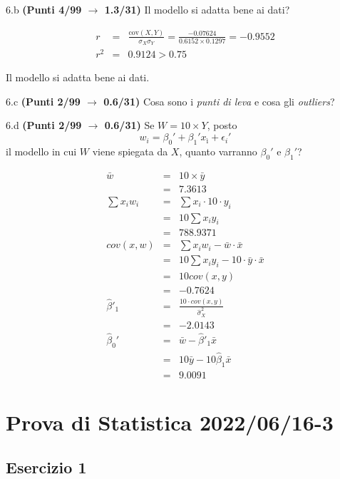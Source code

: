 \documentclass[
  11pt,
]{book}
\theoremstyle{mytheoremstyle}
\theoremstyle{mydefstyle}
\newenvironment{sol}
  {
  \begin{tcolorbox}[enhanced,breakable,arc=0.1mm,boxrule=1pt,colback=white,colframe=iblue,
  title=\bf \fontfamily{lmss}\selectfont \hspace{.5 cm} Soluzione,drop fuzzy shadow]

}{
\end{tcolorbox}
  }
\begin{document}
6.b \textbf{(Punti 4/99 \(\rightarrow\) 1.3/31)} Il modello si adatta bene ai dati?

\begin{sol}
\begin{eqnarray*}
r&=&\frac{\text{cov}(X,Y)}{\sigma_X\sigma_Y}=\frac{ -0.07624 }{ 0.6152 \times 0.1297 }= -0.9552 \\ 
r^2&=& 0.9124 > 0.75
\end{eqnarray*}

Il modello si adatta bene ai dati.

\end{sol}

6.c \textbf{(Punti 2/99 \(\rightarrow\) 0.6/31)} Cosa sono i \emph{punti di leva} e cosa gli \emph{outliers}?

6.d \textbf{(Punti 2/99 \(\rightarrow\) 0.6/31)} Se \(W=10\times Y\), posto
\[w_i=\beta_0'+\beta_1'x_ì +\epsilon_i'\]
il modello in cui \(W\) viene spiegata da \(X\), quanto varranno \(\beta_0'\) e \(\beta_1'\)?

\begin{sol}
\begin{eqnarray*}
  \bar w &=& 10\times \bar y\\
  &=& 7.3613\\
  \sum x_iw_i&=&\sum x_i\cdot 10\cdot y_i\\
  &=& 10\sum x_i y_i\\
  &=& 788.9371\\
  cov(x,w)&=&\sum x_iw_i-\bar w\cdot\bar x\\
  &=&10\sum x_i y_i - 10 \cdot\bar y\cdot\bar x\\
  &=&10 cov(x,y)\\
  &=& -0.7624\\
  \hat\beta'_1&=&\frac{10\cdot cov(x,y)}{\hat\sigma_X^2}\\
  &=&-2.0143\\
  \hat\beta_0'&=& \bar w -\hat\beta'_1\bar x\\
  &=&10\bar y - 10 \hat \beta_1\bar x\\
  &=&9.0091
\end{eqnarray*}

\end{sol}

\section{Prova di Statistica 2022/06/16-3}\label{prova-di-statistica-20220616-3}

\subsection{Esercizio 1}\label{esercizio-1-12}
\end{document}
